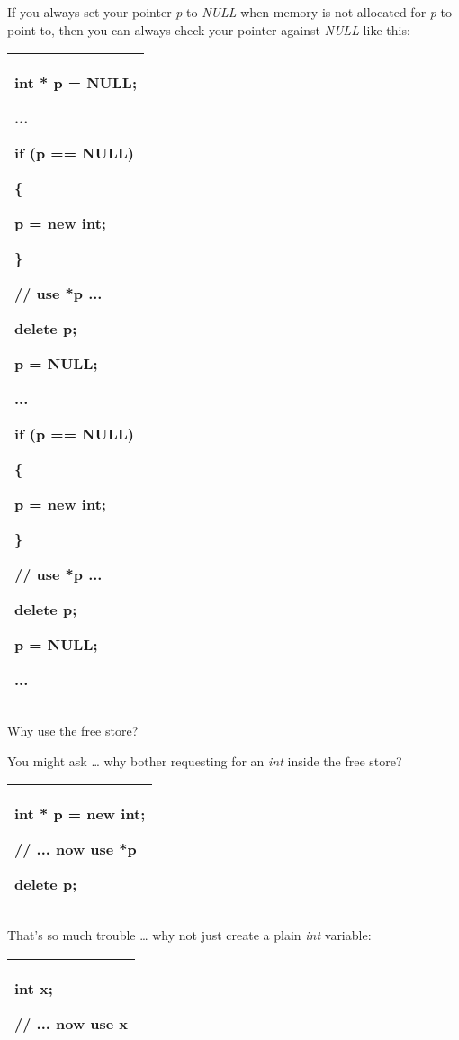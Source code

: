\documentclass[
]{article}
\begin{document}
If you always set your pointer \emph{p} to \emph{NULL} when memory is
not allocated for \emph{p} to point to, then you can always check your
pointer against \emph{NULL} like this:

\begin{longtable}[]{@{}l@{}}
\toprule
\endhead
\begin{minipage}[t]{0.97\columnwidth}\raggedright
int * p = NULL;

...

if (p == NULL)

\{

p = new int;

\}

// use *p ...

delete p;

p = NULL;

...

if (p == NULL)

\{

p = new int;

\}

// use *p ...

delete p;

p = NULL;

...\strut
\end{minipage}\tabularnewline
\bottomrule
\end{longtable}

Why use the free store?

You might ask \ldots{} why bother requesting for an \emph{int} inside
the free store?

\begin{longtable}[]{@{}l@{}}
\toprule
\endhead
\begin{minipage}[t]{0.97\columnwidth}\raggedright
int * p = new int;

// ... now use *p

delete p;\strut
\end{minipage}\tabularnewline
\bottomrule
\end{longtable}

That's so much trouble \ldots{} why not just create a plain \emph{int}
variable:

\begin{longtable}[]{@{}l@{}}
\toprule
\endhead
\begin{minipage}[t]{0.97\columnwidth}\raggedright
int x;

// ... now use x\strut
\end{minipage}\tabularnewline
\bottomrule
\end{longtable}
\end{document}
